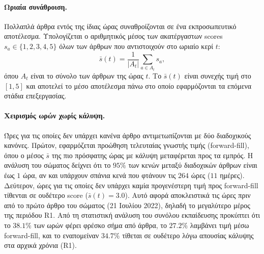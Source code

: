 
\paragraph{Ωριαία συνάθροιση.}
Πολλαπλά άρθρα εντός της ίδιας ώρας συναθροίζονται σε ένα εκπροσωπευτικό
αποτέλεσμα. Υπολογίζεται ο αριθμητικός μέσος των ακατέργαστων scores
$s_a \in \{1, 2, 3, 4, 5\}$ όλων των άρθρων που αντιστοιχούν στο ωριαίο 
κερί $t$:
\begin{equation}
  \bar{s}(t) = \frac{1}{|A_t|} \sum_{a \in A_t} s_a,
  \label{eq:aggregation}
\end{equation}
όπου $A_t$ είναι το σύνολο των άρθρων της ώρας $t$. Το $\bar{s}(t)$ είναι
συνεχής τιμή στο $[1, 5]$ και αποτελεί το μέσο αποτέλεσμα πάνω στο
οποίο εφαρμόζονται τα επόμενα στάδια επεξεργασίας.

\paragraph{Χειρισμός ωρών χωρίς κάλυψη.}
Ώρες για τις οποίες δεν υπάρχει κανένα άρθρο αντιμετωπίζονται με δύο
διαδοχικούς κανόνες. Πρώτον, εφαρμόζεται προώθηση τελευταίας γνωστής τιμής
(forward-fill), όπου ο μέσος $\bar{s}$ της πιο πρόσφατης ώρας με κάλυψη μεταφέρεται
προς τα εμπρός. Η ανάλυση του σώματος δείχνει ότι το $95\%$ των κενών μεταξύ
διαδοχικών άρθρων είναι έως $1$ ώρα, αν και υπάρχουν σπάνια κενά που φτάνουν
τις $264$ ώρες ($11$ ημέρες). Δεύτερον, ώρες για τις οποίες δεν υπάρχει καμία προγενέστερη τιμή προς
forward-fill τίθενται σε ουδέτερο score ($\bar{s}(t) = 3{.}0$). Αυτό αφορά
αποκλειστικά τις ώρες πριν από το πρώτο άρθρο του σώματος (21 Ιουλίου 2022),
δηλαδή το μεγαλύτερο μέρος της περιόδου R1. Από τη στατιστική
ανάλυση του συνόλου εκπαίδευσης προκύπτει ότι το $38{.}1\%$ των ωρών φέρει
φρέσκο σήμα από άρθρα, το $27{.}2\%$ λαμβάνει τιμή μέσω forward-fill, και το
εναπομείναν $34{.}7\%$ τίθεται σε ουδέτερο λόγω απουσίας κάλυψης στα αρχικά
χρόνια (R1).

